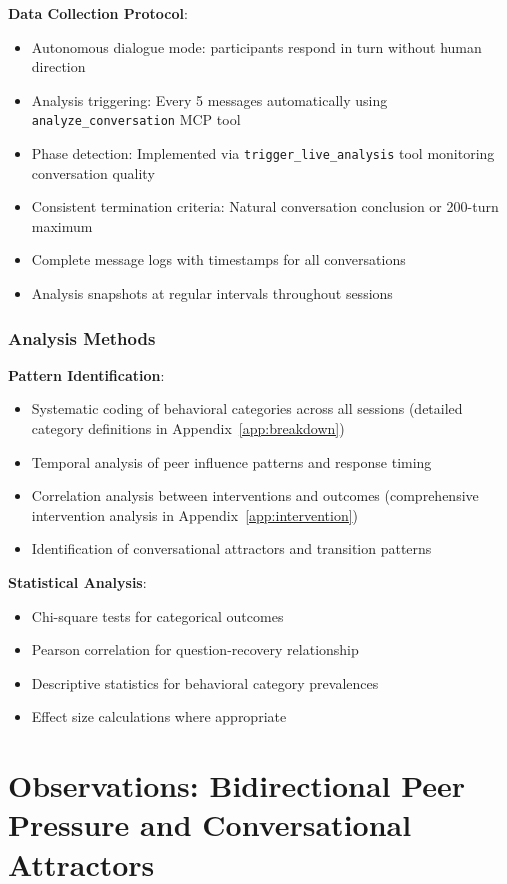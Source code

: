 \documentclass[11pt,letterpaper]{article}
\begin{document}
\textbf{Data Collection Protocol}:
\begin{itemize}
    \item Autonomous dialogue mode: participants respond in turn without human direction
    \item Analysis triggering: Every 5 messages automatically using \texttt{analyze\_conversation} MCP tool
    \item Phase detection: Implemented via \texttt{trigger\_live\_analysis} tool monitoring conversation quality
    \item Consistent termination criteria: Natural conversation conclusion or 200-turn maximum
    \item Complete message logs with timestamps for all conversations
    \item Analysis snapshots at regular intervals throughout sessions
\end{itemize}

\subsubsection{Analysis Methods}

\textbf{Pattern Identification}:
\begin{itemize}
    \item Systematic coding of behavioral categories across all sessions (detailed category definitions in Appendix~\ref{app:breakdown})
    \item Temporal analysis of peer influence patterns and response timing
    \item Correlation analysis between interventions and outcomes (comprehensive intervention analysis in Appendix~\ref{app:intervention})
    \item Identification of conversational attractors and transition patterns
\end{itemize}

\textbf{Statistical Analysis}:
\begin{itemize}
    \item Chi-square tests for categorical outcomes
    \item Pearson correlation for question-recovery relationship
    \item Descriptive statistics for behavioral category prevalences
    \item Effect size calculations where appropriate
\end{itemize}

\section{Observations: Bidirectional Peer Pressure and Conversational Attractors}
\end{document}
